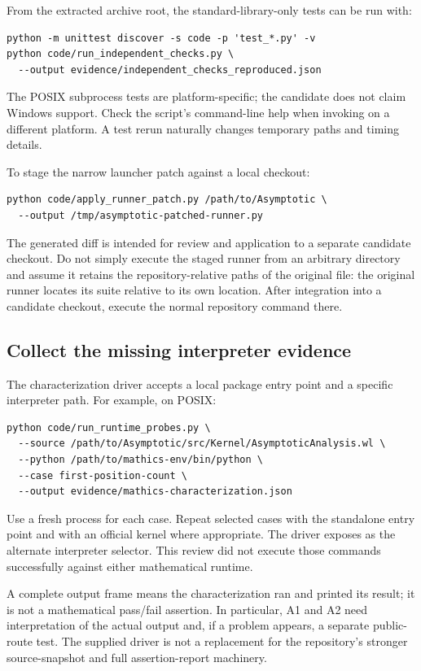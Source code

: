 \documentclass[11pt,letterpaper]{article}
\newcommand{\code}[1]{\texttt{\detokenize{#1}}}
\begin{document}
From the extracted archive root, the standard-library-only tests can be run with:
\begin{lstlisting}
python -m unittest discover -s code -p 'test_*.py' -v
python code/run_independent_checks.py \
  --output evidence/independent_checks_reproduced.json
\end{lstlisting}
The POSIX subprocess tests are platform-specific; the candidate does not claim Windows support. Check the script's command-line help when invoking on a different platform. A test rerun naturally changes temporary paths and timing details.

To stage the narrow launcher patch against a local checkout:
\begin{lstlisting}
python code/apply_runner_patch.py /path/to/Asymptotic \
  --output /tmp/asymptotic-patched-runner.py
\end{lstlisting}
The generated diff is intended for review and application to a separate candidate checkout. Do not simply execute the staged runner from an arbitrary directory and assume it retains the repository-relative paths of the original file: the original runner locates its suite relative to its own location. After integration into a candidate checkout, execute the normal repository command there.

\subsection{Collect the missing interpreter evidence}

The characterization driver accepts a local package entry point and a specific interpreter path. For example, on POSIX:
\begin{lstlisting}
python code/run_runtime_probes.py \
  --source /path/to/Asymptotic/src/Kernel/AsymptoticAnalysis.wl \
  --python /path/to/mathics-env/bin/python \
  --case first-position-count \
  --output evidence/mathics-characterization.json
\end{lstlisting}
Use a fresh process for each case. Repeat selected cases with the standalone entry point and with an official kernel where appropriate. The driver exposes \code{--wolfram} as the alternate interpreter selector. This review did not execute those commands successfully against either mathematical runtime.

A complete output frame means the characterization ran and printed its result; it is not a mathematical pass/fail assertion. In particular, A1 and A2 need interpretation of the actual output and, if a problem appears, a separate public-route test. The supplied driver is not a replacement for the repository's stronger source-snapshot and full assertion-report machinery.
\end{document}
